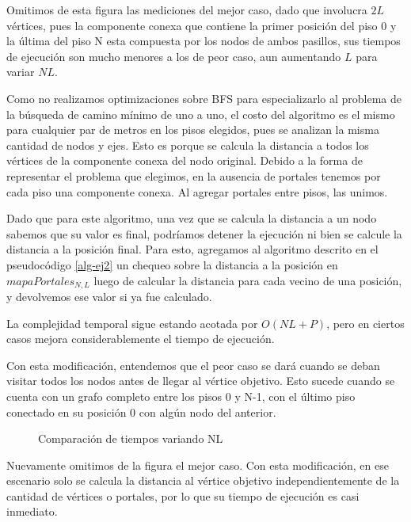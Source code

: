 Omitimos de esta figura las mediciones del mejor caso, dado que involucra $2L$ vértices, pues la componente conexa que contiene la primer posición del piso 0 y la última del piso N esta compuesta por los nodos de ambos pasillos, sus tiempos de ejecución son mucho menores a los de peor caso, aun aumentando $L$ para variar $NL$.


Como no realizamos optimizaciones sobre BFS para especializarlo al problema de la búsqueda de camino mínimo de uno a uno, el costo del algoritmo es el mismo para cualquier par de metros en los pisos elegidos, pues se analizan la misma cantidad de nodos y ejes.
Esto es porque se calcula la distancia a todos los vértices de la componente conexa del nodo original. Debido a la forma de representar el problema que elegimos, en la ausencia de portales tenemos por cada piso una componente conexa. Al agregar portales entre pisos, las unimos. 


Dado que para este algoritmo, una vez que se calcula la distancia a un nodo sabemos que su valor es final, podríamos detener la ejecución ni bien se calcule la distancia a la posición final. Para esto, agregamos al algoritmo descrito en el pseudocódigo \ref{alg-ej2} un chequeo sobre la distancia a la posición en $mapaPortales_{N,L}$ luego de calcular la distancia para cada vecino de una posición, y devolvemos ese valor si ya fue calculado.

La complejidad temporal sigue estando acotada por $O(NL+P)$, pero en ciertos casos 
mejora considerablemente el tiempo de ejecución. 

Con esta modificación, entendemos que el peor caso se dará cuando se deban visitar todos los nodos antes de llegar al vértice objetivo. Esto sucede cuando se cuenta con un grafo completo entre los pisos 0 y N-1, con el último piso conectado en su posición 0 con algún nodo del anterior.

\begin{figure}[H]

\caption{Comparación de tiempos variando NL}
\end{figure}

Nuevamente omitimos de la figura el mejor caso. Con esta modificación, en ese escenario solo se calcula la distancia al vértice objetivo independientemente de la cantidad de vértices o portales, por lo que su tiempo de ejecución es casi inmediato.




